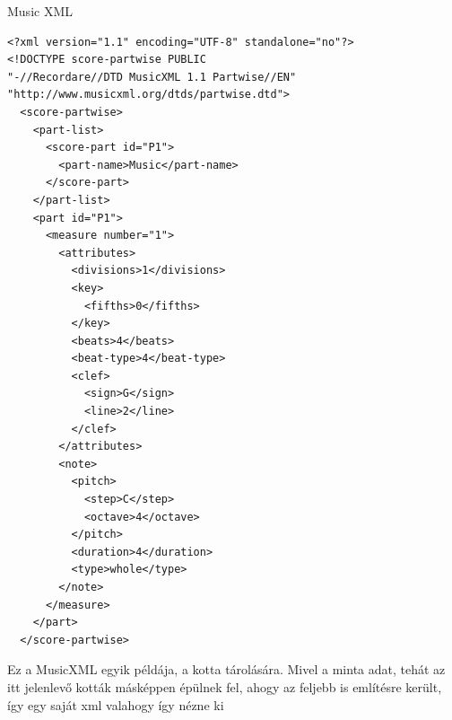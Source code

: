 \begin{large}
	Music XML
\end{large}
\begin{lstlisting}
<?xml version="1.1" encoding="UTF-8" standalone="no"?>
<!DOCTYPE score-partwise PUBLIC
"-//Recordare//DTD MusicXML 1.1 Partwise//EN"
"http://www.musicxml.org/dtds/partwise.dtd">
  <score-partwise>
    <part-list>
      <score-part id="P1">
        <part-name>Music</part-name>
      </score-part>
    </part-list>
    <part id="P1">
      <measure number="1">
        <attributes>
          <divisions>1</divisions>
          <key>
            <fifths>0</fifths>
          </key>
          <beats>4</beats>
          <beat-type>4</beat-type>
          <clef>
            <sign>G</sign>
            <line>2</line>
          </clef>
        </attributes>
        <note>
          <pitch>
            <step>C</step>
            <octave>4</octave>
          </pitch>
          <duration>4</duration>
          <type>whole</type>
        </note>
      </measure>
    </part>
  </score-partwise>
\end{lstlisting}

Ez a MusicXML egyik példája, a kotta tárolására. Mivel a minta adat, tehát az itt jelenlevő kották másképpen épülnek fel, ahogy az feljebb is említésre került, így egy saját xml valahogy így nézne ki

